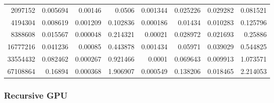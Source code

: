 \begin{tabular}{r r r r r r r r}
2097152 & 0.005694 & 0.00146 & 0.0506 & 0.001344 & 0.025226 & 0.029282 & 0.081521 \\
4194304 & 0.008619 & 0.001209 & 0.102836 & 0.000186 & 0.01434 & 0.010283 & 0.125796 \\
8388608 & 0.015567 & 0.000048 & 0.214321 & 0.00021 & 0.028972 & 0.021693 & 0.25886 \\
16777216 & 0.041236 & 0.00085 & 0.443878 & 0.001434 & 0.05971 & 0.039029 & 0.544825 \\
33554432 & 0.082462 & 0.000267 & 0.921466 & 0.0001 & 0.069643 & 0.009913 & 1.073571 \\
67108864 & 0.16894 & 0.000368 & 1.906907 & 0.000549 & 0.138206 & 0.018465 & 2.214053 \\
\end{tabular}

\subsubsection{Recursive GPU}

